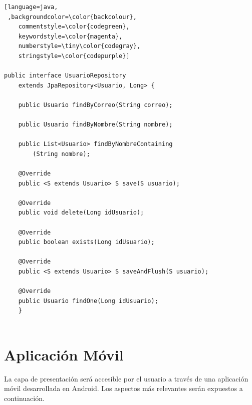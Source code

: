	
	
	
	
	\begin{lstlisting}[language=java,
 ,backgroundcolor=\color{backcolour},   
    commentstyle=\color{codegreen},
    keywordstyle=\color{magenta},
    numberstyle=\tiny\color{codegray},
    stringstyle=\color{codepurple}]
    
public interface UsuarioRepository 
	extends JpaRepository<Usuario, Long> {

	public Usuario findByCorreo(String correo);

	public Usuario findByNombre(String nombre);

	public List<Usuario> findByNombreContaining
		(String nombre);

	@Override
	public <S extends Usuario> S save(S usuario);

	@Override
	public void delete(Long idUsuario);

	@Override
	public boolean exists(Long idUsuario);

	@Override
	public <S extends Usuario> S saveAndFlush(S usuario);

	@Override
	public Usuario findOne(Long idUsuario);
	}


\end{lstlisting} 
	
	
	
	
\section{Aplicación Móvil}
La capa de presentación será accesible por el usuario a través de una aplicación móvil desarrollada en Android. Los aspectos más relevantes serán expuestos a continuación.

